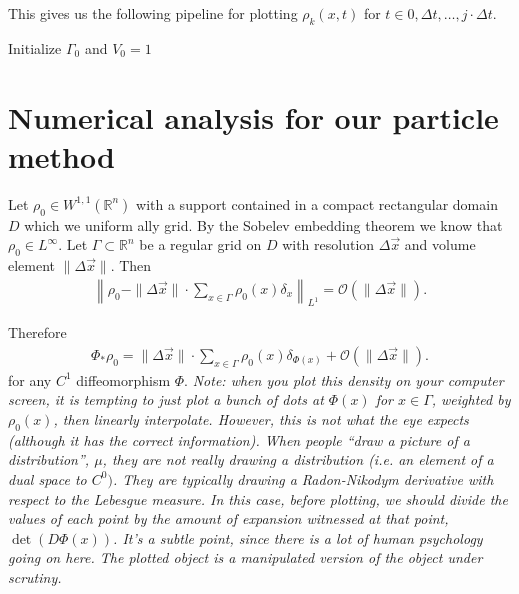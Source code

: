 \documentclass[12pt]{amsart}
\begin{document}
This gives us the following pipeline for plotting $\rho_k(x,t)$ for $t \in 0, \Delta t, \dots, j \cdot \Delta t$.
\begin{algorithm}[H]
	Initialize $\Gamma_0$ and $V_0 = 1$ \;
\end{algorithm}


\section{Numerical analysis for our particle method}

Let $\rho_0 \in W^{1,1}( \mathbb{R}^n) $ with a support contained in a compact rectangular domain $D$ which we uniform ally grid.
By the Sobelev embedding theorem we know that $\rho_0 \in L^\infty$.
Let $\Gamma \subset \mathbb{R}^n$ be a regular grid on $D$ with resolution $\Delta \vec{x}$ and volume element $ \| \Delta \vec{x} \|$.
Then
\begin{align*}
	 \left \| \rho_0 - \| \Delta \vec{x} \| \cdot \sum_{x \in \Gamma} \rho_0( x ) \delta_{x} \right \|_{L^1} = \mathcal{O}( \| \Delta \vec{x} \| ).
\end{align*}

Therefore
\begin{align*}
	\Phi_* \rho_0 = \| \Delta \vec{x} \| \cdot \sum_{x \in \Gamma} \rho_0( x ) \delta_{ \Phi(x) } + \mathcal{O}( \| \Delta \vec{x} \| ).
\end{align*}
for any $C^1$ diffeomorphism $\Phi$.
\emph{Note: when you plot this density on your computer screen, it is tempting to just plot a bunch of dots at $\Phi(x)$ for $x \in \Gamma$,
weighted by $\rho_0(x)$, then linearly interpolate.
However, this is not what the eye expects (although it has the correct information).
When people ``draw a picture of a distribution'', $\mu$, they are not really drawing a distribution (i.e. an element of a dual space to $C^0)$.
They are typically drawing a Radon-Nikodym derivative with respect to the Lebesgue measure.
In this case, before plotting, we should divide the values of each point by the amount of expansion witnessed at that point, $\det( D\Phi(x) )$.
It's a subtle point, since there is a lot of human psychology going on here.
The plotted object is a manipulated version of the object under scrutiny.}






\end{document}

